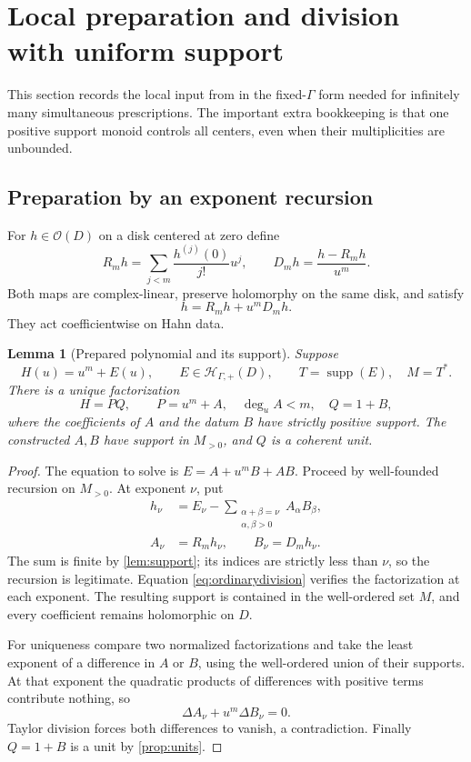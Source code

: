 \documentclass[11pt,letterpaper]{article}
\newtheorem{lemma}[theorem]{Lemma}
\theoremstyle{definition}
\theoremstyle{remark}
\newcommand{\OO}{\mathcal O}
\newcommand{\HP}{\mathscr H_{\Gamma,+}}
\newcommand{\supp}{\operatorname{supp}}
\numberwithin{equation}{section}
\begin{document}
\section{Local preparation and division with uniform support}\label{sec:local}
This section records the local input from \cite{Supplied} in the fixed-$\Gamma$ form needed for infinitely many simultaneous prescriptions. The important extra bookkeeping is that one positive support monoid controls all centers, even when their multiplicities are unbounded.

\subsection{Preparation by an exponent recursion}
For $h\in\OO(D)$ on a disk centered at zero define
\[
 R_mh=\sum_{j<m}\frac{h^{(j)}(0)}{j!}u^j,
 \qquad D_mh=\frac{h-R_mh}{u^m}.
\]
Both maps are complex-linear, preserve holomorphy on the same disk, and satisfy
\begin{equation}\label{eq:ordinarydivision}
 h=R_mh+u^mD_mh.
\end{equation}
They act coefficientwise on Hahn data.

\begin{lemma}[Prepared polynomial and its support]\label{lem:preparation}
Suppose
\[
 H(u)=u^m+E(u),\qquad E\in\HP(D),
 \qquad T=\supp(E),\quad M=T^*.
\]
There is a unique factorization
\begin{equation}\label{eq:localprep}
 H=P Q,\qquad P=u^m+A,\quad \deg_u A<m,\quad Q=1+B,
\end{equation}
where the coefficients of $A$ and the datum $B$ have strictly positive support. The constructed $A,B$ have support in $M_{>0}$, and $Q$ is a coherent unit.
\end{lemma}
\begin{proof}
The equation to solve is $E=A+u^mB+AB$. Proceed by well-founded recursion on $M_{>0}$. At exponent $\nu$, put
\begin{align}
 h_\nu&=E_\nu-
 \sum_{\substack{\alpha+\beta=\nu\\\alpha,\beta>0}}
 A_\alpha B_\beta,\label{eq:preph}\\
 A_\nu&=R_mh_\nu,\qquad B_\nu=D_mh_\nu.\label{eq:prepsteps}
\end{align}
The sum is finite by \cref{lem:support}; its indices are strictly less than $\nu$, so the recursion is legitimate. Equation \eqref{eq:ordinarydivision} verifies the factorization at each exponent. The resulting support is contained in the well-ordered set $M$, and every coefficient remains holomorphic on $D$.

For uniqueness compare two normalized factorizations and take the least exponent of a difference in $A$ or $B$, using the well-ordered union of their supports. At that exponent the quadratic products of differences with positive terms contribute nothing, so
\[
 \Delta A_\nu+u^m\Delta B_\nu=0.
\]
Taylor division forces both differences to vanish, a contradiction. Finally $Q=1+B$ is a unit by \cref{prop:units}.
\end{proof}
\end{document}
